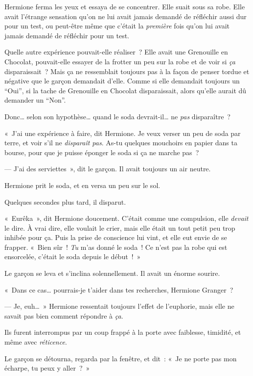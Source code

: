 Hermione ferma les yeux et essaya de se concentrer. Elle suait sous sa robe. Elle avait l'étrange sensation qu'on ne lui avait jamais demandé de réfléchir aussi dur pour un test, ou peut-être même que c'était la \emph{première} fois qu'on lui avait jamais demandé de réfléchir pour un test.

Quelle autre expérience pouvait-elle réaliser~? Elle avait une Grenouille en Chocolat, pouvait-elle essayer de la frotter un peu sur la robe et de voir si \emph{ça} disparaissait~? Mais ça ne ressemblait toujours pas à la façon de penser tordue et négative que le garçon demandait d'elle. Comme si elle demandait toujours un “Oui”, si la tache de Grenouille en Chocolat disparaissait, alors qu'elle aurait dû demander un “Non”.

Donc… selon son hypothèse… quand le soda devrait-il… ne \emph{pas} disparaître~?

«~J'ai une expérience à faire, dit Hermione. Je veux verser un peu de soda par terre, et voir s'il ne \emph{disparaît pas}. As-tu quelques mouchoirs en papier dans ta bourse, pour que je puisse éponger le soda si ça ne marche pas~?

--- J'ai des serviettes~», dit le garçon. Il avait toujours un air neutre.

Hermione prit le soda, et en versa un peu sur le sol.

Quelques secondes plus tard, il disparut.

«~Eurêka~», dit Hermione doucement. C'était comme une compulsion, elle \emph{devait} le dire. À vrai dire, elle voulait le crier, mais elle était un tout petit peu trop inhibée pour ça. Puis la prise de conscience lui vint, et elle eut envie de se frapper. «~Bien sûr~! \emph{Tu} m'as donné le soda~! Ce n'est pas la robe qui est ensorcelée, c'était le soda depuis le début~!~»

Le garçon se leva et s'inclina solennellement. Il avait un énorme sourire.

«~Dans ce cas… pourrais-je t'aider dans tes recherches, Hermione Granger~?

--- Je, euh…~» Hermione ressentait toujours l'effet de l'euphorie, mais elle ne savait pas bien comment répondre à \emph{ça}.

Ils furent interrompus par un coup frappé à la porte avec faiblesse, timidité, et même avec \emph{réticence}.

Le garçon se détourna, regarda par la fenêtre, et dit~: «~Je ne porte pas mon écharpe, tu peux y aller~?~»

